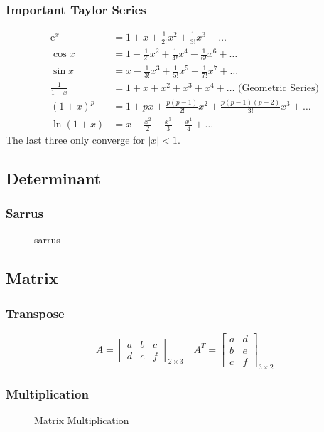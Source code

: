 \subsubsection{Important Taylor Series}
$$
\begin{aligned}
\mathrm{e}^{x} & =1+x+\frac{1}{2 !} x^{2}+\frac{1}{3 !} x^{3}+\ldots \\
\cos x & =1-\frac{1}{2 !} x^{2}+\frac{1}{4 !} x^{4}-\frac{1}{6 !} x^{6}+\ldots \\
\sin x & =x-\frac{1}{3 !} x^{3}+\frac{1}{5 !} x^{5}-\frac{1}{7 !} x^{7}+\ldots \\
\frac{1}{1-x} & =1+x+x^{2}+x^{3}+x^{4}+\ldots \text{   (Geometric Series)}\\
(1+x)^{p} & =1+p x+\frac{p(p-1)}{2 !} x^{2}+\frac{p(p-1)(p-2)}{3 !} x^{3}+\ldots \\
\ln (1+x) & =x-\frac{x^{2}}{2}+\frac{x^{3}}{3}-\frac{x^{4}}{4}+\ldots
\end{aligned}
$$
The last three only converge for $|x|<1$. 
\subsection{Determinant}
\subsubsection{Sarrus}
\begin{figure}[ht]
  \centering
  \caption{sarrus}
  \label{fig:sarrus}
\end{figure}
\subsection{Matrix}
\subsubsection{Transpose}
\begin{equation}
A=\left[\begin{array}{lll}
a & b & c \\
d & e & f
\end{array}\right]_{2 \times 3} \quad A^{T}=\left[\begin{array}{ll}
a & d \\
b & e \\
c & f
\end{array}\right]_{3 \times 2}
\end{equation}
\subsubsection{Multiplication}
\begin{figure}[ht]
  \centering
  \caption{Matrix Multiplication}
  \label{fig:matrix_multiplication}
\end{figure}